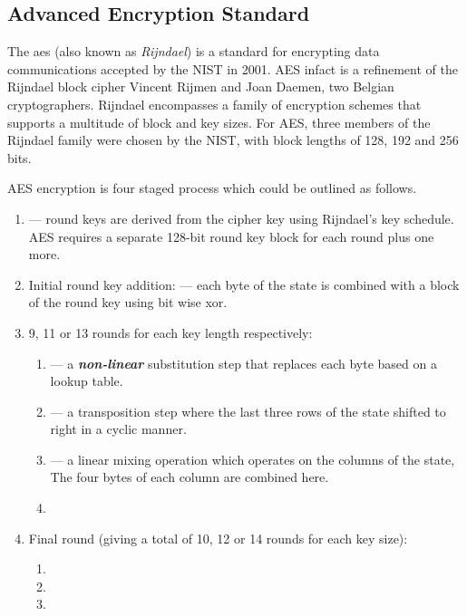 \subsection{Advanced Encryption Standard}\label{subsec:aes}

The \acrfull{aes} (also known as \textit{Rijndael}) is a standard for encrypting data communications accepted by the NIST in 2001. AES infact is a refinement of the Rijndael block cipher Vincent Rijmen and Joan Daemen, two Belgian cryptographers. Rijndael encompasses a family of encryption schemes that supports a multitude of block and key sizes. For AES, three members of the Rijndael family were chosen by the NIST, with block lengths of 128, 192 and 256 bits.

AES encryption is four staged process which could be outlined as follows.

\begin{enumerate}
    \item {} — round keys are derived from the cipher key using Rijndael's key schedule. AES requires a separate 128-bit round key block for each round plus one more.
    
    \item Initial round key addition:  — each byte of the state is combined with a block of the round key using bit wise xor.
    
    \item 9, 11 or 13 rounds for each key length respectively:
    \begin{enumerate}
        \item {} — a \textbf{\textit{non-linear}} substitution step that replaces each byte based on a lookup table.
        
        \item {} — a transposition step where the last three rows of the state shifted to right in a cyclic manner.
        
        \item {} — a linear mixing operation which operates on the columns of the state, The four bytes of each column are combined here.
        
        \item {}
    \end{enumerate}
    
    \item Final round (giving a total of 10, 12 or 14 rounds for each key size):
    \begin{enumerate}
        \item {}
        \item {}
        \item {}
    \end{enumerate}
\end{enumerate}

